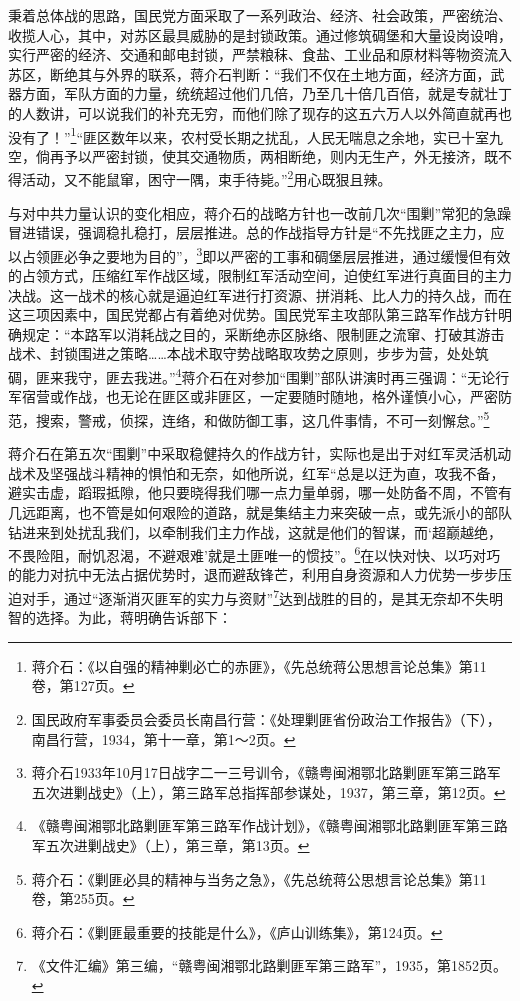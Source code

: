 秉着总体战的思路，国民党方面采取了一系列政治、经济、社会政策，严密统治、收揽人心，其中，对苏区最具威胁的是封锁政策。通过修筑碉堡和大量设岗设哨，实行严密的经济、交通和邮电封锁，严禁粮秣、食盐、工业品和原材料等物资流入苏区，断绝其与外界的联系，蒋介石判断：“我们不仅在土地方面，经济方面，武器方面，军队方面的力量，统统超过他们几倍，乃至几十倍几百倍，就是专就壮丁的人数讲，可以说我们的补充无穷，而他们除了现存的这五六万人以外简直就再也没有了！”\footnote{蒋介石：《以自强的精神剿必亡的赤匪》，《先总统蒋公思想言论总集》第11卷，第127页。}“匪区数年以来，农村受长期之扰乱，人民无喘息之余地，实已十室九空，倘再予以严密封锁，使其交通物质，两相断绝，则内无生产，外无接济，既不得活动，又不能鼠窜，困守一隅，束手待毙。”\footnote{国民政府军事委员会委员长南昌行营：《处理剿匪省份政治工作报告》（下），南昌行营，1934，第十一章，第1～2页。}用心既狠且辣。


与对中共力量认识的变化相应，蒋介石的战略方针也一改前几次“围剿”常犯的急躁冒进错误，强调稳扎稳打，层层推进。总的作战指导方针是“不先找匪之主力，应以占领匪必争之要地为目的”，\footnote{蒋介石1933年10月17日战字二一三号训令，《赣粤闽湘鄂北路剿匪军第三路军五次进剿战史》（上），第三路军总指挥部参谋处，1937，第三章，第12页。}即以严密的工事和碉堡层层推进，通过缓慢但有效的占领方式，压缩红军作战区域，限制红军活动空间，迫使红军进行真面目的主力决战。这一战术的核心就是逼迫红军进行打资源、拼消耗、比人力的持久战，而在这三项因素中，国民党都占有着绝对优势。国民党军主攻部队第三路军作战方针明确规定：“本路军以消耗战之目的，采断绝赤区脉络、限制匪之流窜、打破其游击战术、封锁围进之策略……本战术取守势战略取攻势之原则，步步为营，处处筑碉，匪来我守，匪去我进。”\footnote{《赣粤闽湘鄂北路剿匪军第三路军作战计划》，《赣粤闽湘鄂北路剿匪军第三路军五次进剿战史》（上），第三章，第13页。}蒋介石在对参加“围剿”部队讲演时再三强调：“无论行军宿营或作战，也无论在匪区或非匪区，一定要随时随地，格外谨慎小心，严密防范，搜索，警戒，侦探，连络，和做防御工事，这几件事情，不可一刻懈怠。”\footnote{蒋介石：《剿匪必具的精神与当务之急》，《先总统蒋公思想言论总集》第11卷，第255页。}


蒋介石在第五次“围剿”中采取稳健持久的作战方针，实际也是出于对红军灵活机动战术及坚强战斗精神的惧怕和无奈，如他所说，红军“总是以迂为直，攻我不备，避实击虚，蹈瑕抵隙，他只要晓得我们哪一点力量单弱，哪一处防备不周，不管有几远距离，也不管是如何艰险的道路，就是集结主力来突破一点，或先派小的部队钻进来到处扰乱我们，以牵制我们主力作战，这就是他们的智谋，而‘超巅越绝，不畏险阻，耐饥忍渴，不避艰难’就是土匪唯一的惯技”。\footnote{蒋介石：《剿匪最重要的技能是什么》，《庐山训练集》，第124页。}在以快对快、以巧对巧的能力对抗中无法占据优势时，退而避敌锋芒，利用自身资源和人力优势一步步压迫对手，通过“逐渐消灭匪军的实力与资财”\footnote{《文件汇编》第三编，“赣粤闽湘鄂北路剿匪军第三路军”，1935，第1852页。}达到战胜的目的，是其无奈却不失明智的选择。为此，蒋明确告诉部下：

